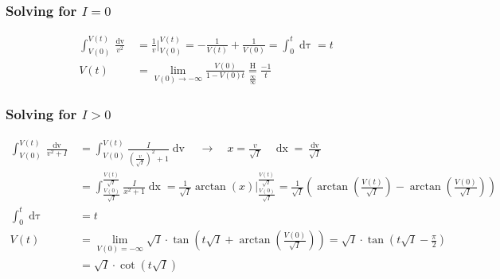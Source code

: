 \subsubsection{Solving for $I = 0$}
\begin{align*}
\int_{V(0)}^{V(t)} \frac{\mathop{dv}}{v^2} &= \frac{1}{v}\Big\rvert_{V(0)}^{V(t)} = - \frac{1}{V(t)} + \frac{1}{V(0)} = \int_0^t \mathop{d\tau} = t \\
V(t) &= \lim_{V(0) \rightarrow - \infty} \frac{V(0)}{1-V(0)t} \underset{\frac{\infty}{\infty}}{\overset{\mathrm{H}}{=}} \frac{-1}{t}
\end{align*}


\subsubsection{Solving for $I > 0$}
\begin{align*}
\int_{V(0)}^{V(t)} \frac{\mathop{dv}}{v^2 + I} &= \int_{V(0)}^{V(t)} \frac{I}{\left(\frac{v}{\sqrt{I}}\right)^2 + 1} \mathop{dv}
\quad \longrightarrow \quad x = \frac{v}{\sqrt{I}} \quad \mathop{dx} = \frac{\mathop{dv}}{\sqrt{I}} \\
&= \int_{\frac{V(0)}{\sqrt{I}}}^{\frac{V(t)}{\sqrt{I}}} \frac{I}{x^2 + 1} \mathop{dx}= \frac{1}{\sqrt{I}} \arctan(x) \Big \rvert_{\frac{V(0)}{\sqrt{I}}}^{\frac{V(t)}{\sqrt{I}}} 
= \frac{1}{\sqrt{I}} \left( \arctan \left( \frac{V(t)}{\sqrt{I}} \right) - \arctan \left( \frac{V(0)}{\sqrt{I}} \right) \right)\\
\int_0^t \mathop{d\tau} &= t \\
V(t) &= \lim_{V(0) = -\infty} \sqrt{I} \cdot \tan \left( t \sqrt{I} + \arctan \left( \frac{V(0)}{\sqrt{I}} \right) \right) = \sqrt{I} \cdot \tan \left( t \sqrt{I} - \frac{\pi}{2} \right) \\
&=  \sqrt{I} \cdot \cot \left( t \sqrt{I} \right) 
\end{align*}

